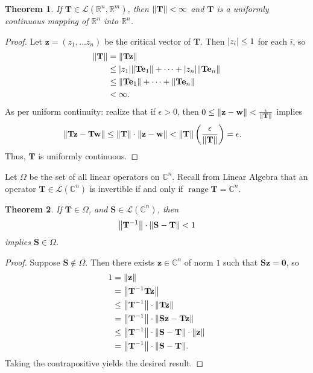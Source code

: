 \documentclass[11pt]{article}
\renewcommand{\vec}[1]{\mathbf{#1}}
\newcommand{\mat}[1]{\mathbf{#1}}
\newcommand{\range}{\operatorname{range}}
\newtheorem{theorem}{Theorem}
\begin{document}
\begin{theorem}
	If $\mat{T} \in \mathcal{L}(\mathbb{R}^{n}, \mathbb{R}^{m})$, then $\norm{\mat{T}} < \infty$ and $\mat{T}$ is a uniformly continuous mapping of $\mathbb{R}^{n}$ into $\mathbb{R}^{n}$.
\end{theorem}
\begin{adjustwidth}{0.5cm}{}
    \begin{proof}
		Let $\vec{z} = (z_{1}, \ldots z_{n})$ be the critical vector of $\mat{T}$. Then $\abs{z_{i}} \le 1$ for each $i$, so
		\begin{align*}
			\norm{\mat{T}} &= \norm{\mat{T} \vec{z}} \\
			&\le \abs{z_{1}} \norm{\mat{T} \vec{e}_{1}} + \cdots + \abs{z_{n}} \norm{\mat{T} \vec{e}_{n}} \\
			&\le \norm{\mat{T} \vec{e}_{1}} + \cdots + \norm{\mat{T} \vec{e}_{n}} \\
			&< \infty.
		\end{align*}
		As per uniform continuity: realize that if $\epsilon > 0$, then $0 \le \norm{\vec{z} - \vec{w}} < \tfrac{\epsilon}{\norm{\mat{T}}}$ implies
		\begin{align*}
			\norm{\mat{T} \vec{z} - \mat{T} \vec{w}} &\le \norm{\mat{T}} \cdot \norm{\vec{z} - \vec{w}} < \norm{\mat{T}} \left( \frac{\epsilon}{\norm{\mat{T}}} \right) = \epsilon.
		\end{align*}
		Thus, $\mat{T}$ is uniformly continuous.
	\end{proof}
\end{adjustwidth}

Let $\Omega$ be the set of all linear operators on $\mathbb{C}^{n}$. Recall from Linear Algebra that an operator $\mat{T} \in \mathcal{L}(\mathbb{C}^{n})$ is invertible if and only if $\range \mat{T} = \mathbb{C}^{n}$.

\begin{theorem}
	If $\mat{T} \in \Omega$, and $\mat{S} \in \mathcal{L}(\mathbb{C}^{n})$, then
	\[
		\norm{\mat{T}^{-1}} \cdot \norm{\mat{S} - \mat{T}} < 1
	\]
	implies $\mat{S} \in \Omega$.
\end{theorem}
\begin{adjustwidth}{0.5cm}{}
	\begin{proof}
		Suppose $\mat{S} \notin \Omega$. Then there exists $\vec{z} \in \mathbb{C}^{n}$ of norm $1$ such that $\mat{S} \vec{z} = \vec{0}$, so
		\begin{align*}
			1 &= \norm{\vec{z}} \\
			&= \norm{\mat{T}^{-1}\mat{T} \vec{z}} \\
			&\le \norm{\mat{T}^{-1}} \cdot \norm{\mat{T} \vec{z}} \\
			&= \norm{\mat{T}^{-1}} \cdot \norm{\mat{S} \vec{z} - \mat{T} \vec{z}} \\
			&\le \norm{\mat{T}^{-1}} \cdot \norm{\mat{S} - \mat{T}} \cdot \norm{\vec{z}} \\
			&= \norm{\mat{T}^{-1}} \cdot \norm{\mat{S} - \mat{T}}.
		\end{align*}
		Taking the contrapositive yields the desired result.
	\end{proof}
\end{adjustwidth}
\end{document}
